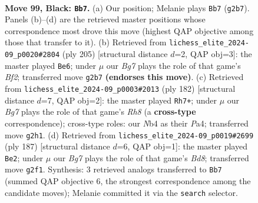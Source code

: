 \documentclass[11pt]{article}
\begin{document}
\clearpage

\begin{figure}[p]\centering
\begin{subfigure}{0.46\textwidth}\centering
\resizebox{\linewidth}{!}{%
\newchessgame
\chessboard[
  setfen={8/7k/8/8/1n1B2K1/8/5Pb1/8 b - - 44 99},
  showmover=false,
  pgfstyle=straightmove, color=movearrow, markmove={g2-b7}
]}
\caption{}
\end{subfigure}\hfill
\begin{subfigure}{0.46\textwidth}\centering
\resizebox{\linewidth}{!}{%
\newchessgame
\chessboard[
  setfen={8/5b2/5P2/8/3B4/8/3k4/1K6 b - - 20 103},
  showmover=false,
  pgfstyle=straightmove, color=movearrow, markmove={f7-e6}
]}
\caption{}
\end{subfigure}
\\[4pt]
\begin{subfigure}{0.46\textwidth}\centering
\resizebox{\linewidth}{!}{%
\newchessgame
\chessboard[
  setfen={7R/2k5/8/p2K4/P7/8/3b4/8 w - - 46 92},
  showmover=false,
  pgfstyle=straightmove, color=movearrow, markmove={h8-h7}
]}
\caption{}
\end{subfigure}\hfill
\begin{subfigure}{0.46\textwidth}\centering
\resizebox{\linewidth}{!}{%
\newchessgame
\chessboard[
  setfen={6B1/8/8/8/3k4/P7/1K6/3b4 b - - 10 94},
  showmover=false,
  pgfstyle=straightmove, color=movearrow, markmove={d1-e2}
]}
\caption{}
\end{subfigure}
\caption{\textbf{Move 99, Black: \texttt{Bb7}.} (a) Our position; Melanie plays \texttt{Bb7} (\texttt{g2b7}). Panels (b)--(d) are the retrieved master positions whose correspondence most drove this move (highest QAP objective among those that transfer to it). (b) Retrieved from \texttt{lichess\_elite\_2024-09\_p0020\#2804} (ply 205) [structural distance $d$=2, QAP obj=3]: the master played \texttt{Be6}; under $\mu$ our \emph{Bg7} plays the role of that game's \emph{Bf2}; transferred move \texttt{g2b7} \textbf{(endorses this move)}. (c) Retrieved from \texttt{lichess\_elite\_2024-09\_p0003\#2013} (ply 182) [structural distance $d$=7, QAP obj=2]: the master played \texttt{Rh7+}; under $\mu$ our \emph{Bg7} plays the role of that game's \emph{Rh8} (a \textbf{cross-type} correspondence); cross-type roles: our \emph{N}b4 as their \emph{P}a4; transferred move \texttt{g2h1}. (d) Retrieved from \texttt{lichess\_elite\_2024-09\_p0019\#2699} (ply 187) [structural distance $d$=6, QAP obj=1]: the master played \texttt{Be2}; under $\mu$ our \emph{Bg7} plays the role of that game's \emph{Bd8}; transferred move \texttt{g2f1}. Synthesis: 3 retrieved analogs transferred to \texttt{Bb7} (summed QAP objective 6, the strongest correspondence among the candidate moves); Melanie committed it via the \texttt{search} selector.}
\label{fig:thought-m197}
\end{figure}
\end{document}
